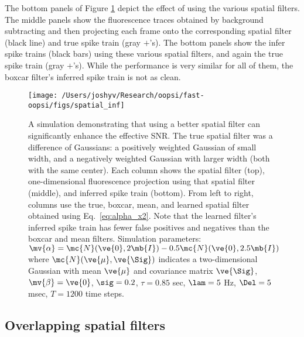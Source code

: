 The bottom panels of Figure \ref{fig:spatial} depict the effect of using the various spatial filters. The middle panels show the fluorescence traces obtained by background subtracting and then projecting each frame onto the corresponding spatial filter (black line) and true spike train (gray $+$'s).  The bottom panels show the infer spike trains (black bars) using these various spatial filters, and again the true spike train (gray $+$'s).  While the performance is very similar for all of them, the boxcar filter's inferred spike train is not as clean.  




\begin{figure}[h!]
\centering \texttt{[image: /Users/joshyv/Research/oopsi/fast-oopsi/figs/spatial\_inf]}
\caption[spatial filtering can improve effective SNR]{A simulation demonstrating that using a better spatial filter can significantly enhance the effective SNR. The true spatial filter was a difference of Gaussians: a positively weighted Gaussian of small width, and a negatively weighted Gaussian with larger width (both with the same center).  Each column shows the spatial filter (top), one-dimensional fluorescence projection using that spatial filter (middle), and inferred spike train (bottom).  From left to right, columns use the true, boxcar, mean, and learned spatial filter obtained using Eq.~\eqref{eq:alpha_x2}. Note that the learned filter's inferred spike train has fewer false positives and negatives than the boxcar and mean filters.  Simulation parameters: $\mv{\alpha}=\mc{N}(\ve{0},2 \mb{I})-0.5 \mc{N}(\ve{0},2.5 \mb{I})$ where $\mc{N}(\ve{\mu},\ve{\Sig})$ indicates a two-dimensional Gaussian with mean $\ve{\mu}$ and covariance matrix $\ve{\Sig}$, $\mv{\beta}=\ve{0}$, $\sig=0.2$, $\tau=0.85$ sec, $\lam=5$ Hz, $\Del=5$ msec, $T=1200$ time steps.} \label{fig:spatial} 
\end{figure}



\subsection{Overlapping spatial filters} \label{sec:results:overlapping}


